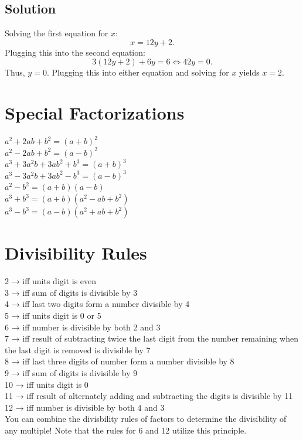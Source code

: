 \documentclass[11pt,letterpaper]{article}
\begin{document}
\begin{minipage}{\textwidth}
\begin{itemize}
\begin{itemize}
               \subsection*{Solution}
               Solving the first equation for $x$:
               \[x = 12y + 2.\]
               Plugging this into the second equation:
               \[3(12y + 2) + 6y = 6 \Leftrightarrow 42 y = 0.\]
               Thus, $y=0$. Plugging this into either equation and solving for $x$ yields $x=2$.
          \end{itemize}
     \end{itemize}
\end{minipage}
\begin{minipage}{\textwidth}
     \section*{Special Factorizations}
     $a^2 +2ab+b^2 = (a+b)^2$ \\ 
     $a^2 - 2ab+b^2 = (a-b)^2$ \\
     $a^3 +3a^2b+3ab^2 +b^3 = (a+b)^3$ \\
     $a^3 -3a^2b+3ab^2 -b^3 = (a-b)^3$ \\
     $a^2 -b^2 =(a+b)(a-b)$ \\
     $a^3 +b^3 =(a+b)(a^2 -ab+b^2)$ \\
     $a^3 -b^3 =(a-b)(a^2 +ab+b^2)$
     \vspace{0.5cm}
\end{minipage}
\begin{minipage}{\textwidth}
     \section*{Divisibility Rules}
     2 → iff units digit is even \\ 
     3 → iff sum of digits is divisible by 3 \\
     4 → iff last two digits form a number divisible by 4 \\
     5 → iff units digit is 0 or 5 \\
     6 → iff number is divisible by both 2 and 3 \\
     7 → iff result of subtracting twice the last digit from the number remaining when the last digit is removed is divisible by 7 \\
     8 → iff last three digits of number form a number divisible by 8 \\
     9 → iff sum of digits is divisible by 9 \\
     10 → iff units digit is 0 \\
     11 → iff result of alternately adding and subtracting the digits is divisible by 11 \\
     12 → iff number is divisible by both 4 and 3 \\
     
     You can combine the divisbility rules of factors to determine the divisibility of any multiple! Note that the rules for 6 and 12 utilize this principle.
     \vspace{0.5cm}
\end{minipage}
\end{document}

